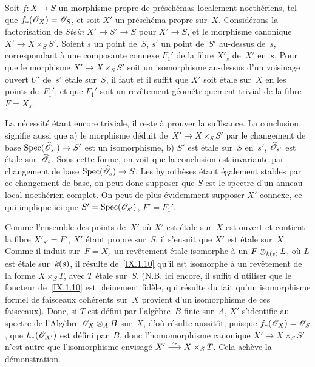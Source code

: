 \begin{corollaire}
\label{IX.6.6}
Soit $f\colon X\to S$ un morphisme propre de pr\'esch\'emas
localement noeth\'eriens, tel que $f_*(\cal{O}_X)=\cal{O}_S$, et
soit $X'$ un pr\'esch\'ema propre sur~$X$. Consid\'erons la
factorisation de \emph{Stein} $X'\to S'\to S$ pour $X'\to S$, et le
morphisme canonique $X'\to X\times_S S'$. Soient $s$ un point de~$S$,
$s'$ un point de~$S'$ au-dessus de~$s$, correspondant \`a une
composante connexe $F_1'$ de la fibre $X'_s$ de~$X'$ en~$s$. Pour que
le morphisme $X'\to X\times_S S'$ soit un isomorphisme au-dessus d'un
voisinage ouvert $U'$ de~$s'$ \'etale sur~$S$, il faut et il suffit
que $X'$ soit \'etale sur~$X$ en les points de~$F_1'$, et que $F_1'$
soit un rev\^etement g\'eom\'etriquement trivial de la fibre
$F=X_s$.
\end{corollaire}

La n\'ecessit\'e \'etant encore triviale, il reste \`a prouver
la suffisance. La conclusion signifie aussi que a) le morphisme
d\'eduit de~$X'\to X\times_S S'$ par le changement de base
$\Spec(\widehat{\cal{O}}_{s'})\to S'$ est un isomorphisme, b) $S'$ est
\'etale sur~$S$ en~$s'$, \ie $\widehat{\cal{O}}_{s'}$ est \'etale
sur~$\widehat{\cal{O}}_s$. Sous cette forme, on voit que la conclusion
est invariante par changement de base $\Spec(\widehat{\cal{O}}_s)\to
S$. Les hypoth\`eses \'etant \'egalement stables par ce
changement de base, on peut donc supposer que $S$ est le spectre d'un
anneau local noeth\'erien complet. On peut de plus \'evidemment
supposer $X'$ connexe, ce qui implique ici que
$S'=\Spec(\cal{O}_{s'})$, $F'=F_1'$.

Comme
l'ensemble des points de~$X'$ o\`u $X'$ est \'etale sur~$X$ est
ouvert et contient la fibre $X'_{s'}=F'$, $X'$ \'etant propre
sur~$S$, il s'ensuit que $X'$ est \'etale sur~$X$. Comme il induit
sur~$F=X_s$ un rev\^etement \'etale isomorphe \`a un
$F\otimes_{\mathit{k}(s)}L$, o\`u $L$ est \'etale sur~$\mathit{k}(s)$, il
r\'esulte de~\ref{IX.1.10} qu'il est isomorphe \`a un
rev\^etement de la forme $X\times_S T$, avec $T$ \'etale sur~$S$.
(N.B. ici encore, il suffit d'utiliser que le foncteur
de~\ref{IX.1.10} est pleinement fid\`ele, qui r\'esulte du fait
qu'un isomorphisme formel de faisceaux coh\'erents sur~$X$ provient
d'un isomorphisme de ces faisceaux). Donc, si $T$ est d\'efini par
l'alg\`ebre~$B$ finie sur~$A$, $X'$ s'identifie au spectre de
l'Alg\`ebre $\cal{O}_X\otimes_A B$ sur~$X$, d'o\`u r\'esulte
aussit\^ot, puisque $f_*(\cal{O}_X)=\cal{O}_S$, que
$h_*(\cal{O}_{X'})$ est d\'efini par~$B$, donc l'homomorphisme
canonique $X'\to X\times_S S'$ n'est autre que l'isomorphisme
envisag\'e $X'\overset{\sim}{\longrightarrow} X\times_S T$. Cela ach\`eve la
d\'emonstration.

